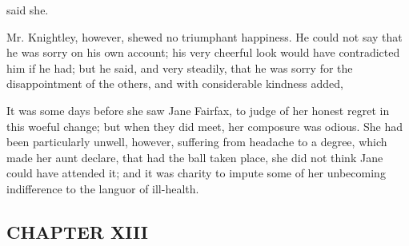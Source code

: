  said she. 

Mr. Knightley, however, shewed no triumphant happiness. He could not say that he was sorry on his own account; his very cheerful look would have contradicted him if he had; but he said, and very steadily, that he was sorry for the disappointment of the others, and with considerable kindness added,


It was some days before she saw Jane Fairfax, to judge of her honest regret in this woeful change; but when they did meet, her composure was odious. She had been particularly unwell, however, suffering from headache to a degree, which made her aunt declare, that had the ball taken place, she did not think Jane could have attended it; and it was charity to impute some of her unbecoming indifference to the languor of ill-health.

\subsection[chapter-xiii-1]{\useURL[url32][][][]\from[url32]CHAPTER XIII}

